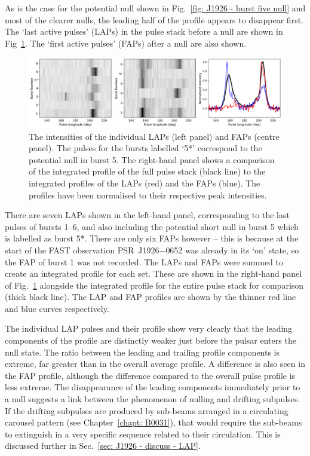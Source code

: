 As is the case for the potential null shown in Fig.~\ref{fig: J1926 - burst five null} and most of the clearer nulls, the leading half of the profile appears to disappear first. The `last active pulses' (LAPs) in the pulse stack before a null are shown in Fig~\ref{fig: J1926 - LAP and FAP profiles}. The `first active pulses' (FAPs) after a null are also shown. 
\begin{figure}
    \begin{center}
        \includegraphics[width=1.0\textwidth]{Figures/J1926/LAPFAP_profiles}
        \caption[Comparison of LAP and FAP profiles to integrated profile]{The intensities of the individual LAPs (left panel) and FAPs (centre panel). The pulses for the bursts labelled `5*' correspond to the potential null in burst 5. The right-hand panel shows a comparison of the integrated profile of the full pulse stack (black line) to the integrated profiles of the LAPs (red) and the FAPs (blue). The profiles have been normalised to their respective peak intensities. }
        \label{fig: J1926 - LAP and FAP profiles}
    \end{center}
\end{figure}
There are seven LAPs shown in the left-hand panel, corresponding to the last pulses of bursts 1--6, and also including the potential short null in burst 5 which is labelled as burst 5*. There are only six FAPs however -- this is because at the start of the FAST observation PSR~J1926$-$0652 was already in its `on' state, so the FAP of burst 1 was not recorded. The LAPs and FAPs were summed to create an integrated profile for each set. These are shown in the right-hand panel of Fig.~\ref{fig: J1926 - LAP and FAP profiles} alongside the integrated profile for the entire pulse stack for comparison (thick black line). The LAP and FAP profiles are shown by the thinner red line and blue curves respectively.

The individual LAP pulses and their profile show very clearly that the leading components of the profile are distinctly weaker just before the pulsar enters the null state. The ratio between the leading and trailing profile components is extreme, far greater than in the overall average profile. A difference is also seen in the FAP profile, although the difference compared to the overall pulse profile is less extreme. The disappearance of the leading components immediately prior to a null suggests a link between the phenomenon of nulling and drifting subpulses. If the drifting subpulses are produced by sub-beams arranged in a circulating carousel pattern (see Chapter~\ref{chapt: B0031}), that would require the sub-beams to extinguish in a very specific sequence related to their circulation. This is discussed further in Sec.~\ref{sec: J1926 - discuss - LAP}.


